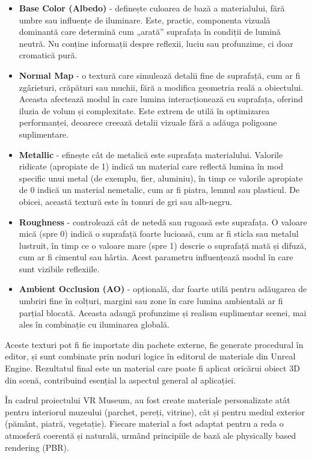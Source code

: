 \begin{itemize}
\item \textbf{Base Color (Albedo)} - definește culoarea de bază a materialului, fără umbre sau influențe de iluminare. Este, practic, componenta vizuală dominantă care determină cum „arată” suprafața în condiții de lumină neutră. Nu conține informații despre reflexii, luciu sau profunzime, ci doar cromatică pură.
\item \textbf{Normal Map} - o textură care simulează detalii fine de suprafață, cum ar fi zgârieturi, crăpături sau muchii, fără a modifica geometria reală a obiectului. Aceasta afectează modul în care lumina interacționează cu suprafața, oferind iluzia de volum și complexitate. Este extrem de utilă în optimizarea performanței, deoarece creează detalii vizuale fără a adăuga poligoane suplimentare.
\item \textbf{Metallic} - efinește cât de metalică este suprafața materialului. Valorile ridicate (apropiate de 1) indică un material care reflectă lumina în mod specific unui metal (de exemplu, fier, aluminiu), în timp ce valorile apropiate de 0 indică un material nemetalic, cum ar fi piatra, lemnul sau plasticul. De obicei, această textură este în tonuri de gri sau alb-negru.
\item \textbf{Roughness} - controlează cât de netedă sau rugoasă este suprafața. O valoare mică (spre 0) indică o suprafață foarte lucioasă, cum ar fi sticla sau metalul lustruit, în timp ce o valoare mare (spre 1) descrie o suprafață mată și difuză, cum ar fi cimentul sau hârtia. Acest parametru influențează modul în care sunt vizibile reflexiile.
\item \textbf{Ambient Occlusion (AO)} - opțională, dar foarte utilă pentru adăugarea de umbriri fine în colțuri, margini sau zone în care lumina ambientală ar fi parțial blocată. Aceasta adaugă profunzime și realism suplimentar scenei, mai ales în combinație cu iluminarea globală.
\end{itemize}

Aceste texturi pot fi fie importate din pachete externe, fie generate procedural în editor, și sunt combinate prin noduri logice în editorul de materiale din Unreal Engine. Rezultatul final este un material care poate fi aplicat oricărui obiect 3D din scenă, contribuind esențial la aspectul general al aplicației.

În cadrul proiectului VR Museum, au fost create materiale personalizate atât pentru interiorul muzeului (parchet, pereți, vitrine), cât și pentru mediul exterior (pământ, piatră, vegetație). Fiecare material a fost adaptat pentru a reda o atmosferă coerentă și naturală, urmând principiile de bază ale physically based rendering (PBR).

